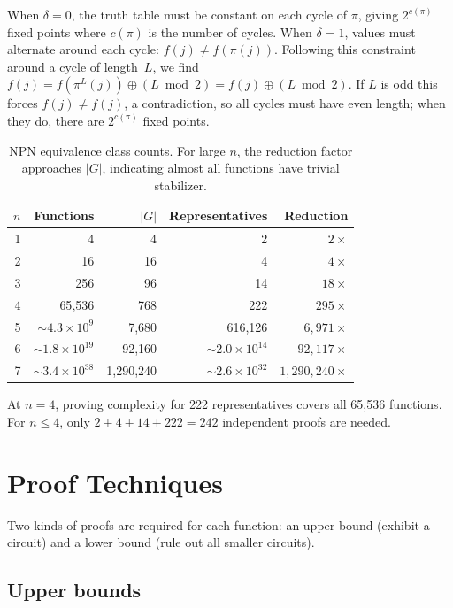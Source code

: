 \documentclass[11pt]{article}
\begin{document}
When $\delta = 0$, the truth table must be constant on each cycle of $\pi$,
giving $2^{c(\pi)}$ fixed points where $c(\pi)$ is the number of cycles.
When $\delta = 1$, values must alternate around each cycle:
$f(j) \neq f(\pi(j))$. Following this constraint around a cycle of length~$L$,
we find $f(j) = f(\pi^L(j)) \oplus (L \bmod 2) = f(j) \oplus (L \bmod 2)$.
If $L$ is odd this forces $f(j) \neq f(j)$, a contradiction, so all cycles
must have even length; when they do, there are $2^{c(\pi)}$ fixed points.

\begin{table}[ht]
\centering
\begin{tabular}{@{}rrrrr@{}}
\toprule
$n$ & Functions & $|G|$ & Representatives & Reduction \\
\midrule
1 & 4 & 4 & 2 & $2\times$ \\
2 & 16 & 16 & 4 & $4\times$ \\
3 & 256 & 96 & 14 & $18\times$ \\
4 & 65{,}536 & 768 & 222 & $295\times$ \\
5 & ${\sim}4.3 \times 10^9$ & 7{,}680 & 616{,}126 & $6{,}971\times$ \\
6 & ${\sim}1.8 \times 10^{19}$ & 92{,}160 & ${\sim}2.0 \times 10^{14}$ & $92{,}117\times$ \\
7 & ${\sim}3.4 \times 10^{38}$ & 1{,}290{,}240 & ${\sim}2.6 \times 10^{32}$ & $1{,}290{,}240\times$ \\
\bottomrule
\end{tabular}
\caption{NPN equivalence class counts. For large $n$, the reduction factor
  approaches $|G|$, indicating almost all functions have trivial stabilizer.}
\label{tab:reps}
\end{table}

At $n = 4$, proving complexity for 222 representatives covers all 65{,}536
functions. For $n \le 4$, only $2 + 4 + 14 + 222 = 242$ independent proofs are
needed.

\section{Proof Techniques}

Two kinds of proofs are required for each function: an upper bound (exhibit a
circuit) and a lower bound (rule out all smaller circuits).

\subsection{Upper bounds}
\end{document}
